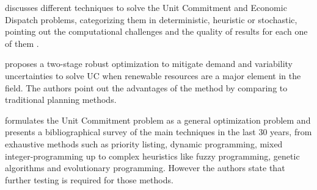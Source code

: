 \documentclass[12pt,LUDisStyle,twosided]{book}
\begin{document}
\begin{table}[h!]
\centering
\caption{Optimal power flow categories. \cite{cain}}
\end{table}


\citeauthor{yamin} \cite{yamin} discusses different techniques to solve the Unit Commitment and Economic Dispatch problems, categorizing them in deterministic, heuristic or stochastic, pointing out the computational challenges and the quality of results for each one of them . 

\citeauthor{bertsimas} \cite{bertsimas} proposes a two-stage robust optimization to mitigate demand and variability uncertainties to solve UC when renewable resources are a major element in the field. The authors point out the advantages of the method by comparing to traditional planning methods. 

\citeauthor{padhy} \cite{padhy} formulates the Unit Commitment problem as a general optimization problem and presents a bibliographical survey of the main techniques in the last 30 years, from exhaustive methods such as priority listing, dynamic programming, mixed integer-programming up to complex heuristics like fuzzy programming, genetic algorithms and evolutionary programming. However the authors state that further testing is required for those methods.
\end{document}
